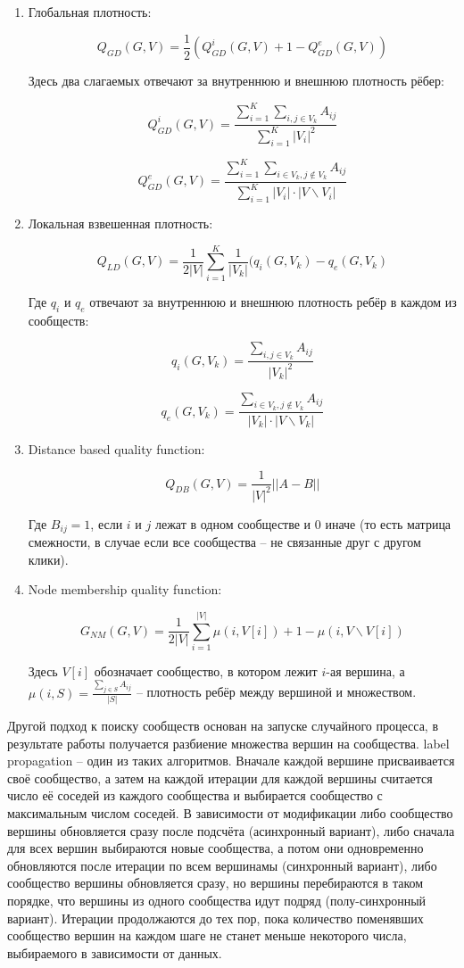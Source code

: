 \documentclass{article}
\begin{document}
\begin{enumerate}
	\item Глобальная плотность:
	
	$$Q_{GD} (G, V) = \frac{1}{2} (Q^i_{GD} (G, V) + 1 - Q^e_{GD} (G, V)) $$	
	
	Здесь два слагаемых отвечают за внутреннюю и внешнюю плотность рёбер:
	
	$$Q^i_{GD} (G, V) = \frac{\sum_{i=1}^K \sum_{i,j\in V_k} A_{ij}}{\sum_{i=1}^K |V_i|^2}$$
	
	$$Q^e_{GD} (G, V) = \frac{\sum_{i=1}^K \sum_{i \in V_k,j \not\in V_k} A_{ij}}
	{\sum_{i=1}^K |V_i| \cdot |V \backslash V_i|}$$
	
	\item Локальная взвешенная плотность:
	
	$$Q_{LD} (G, V) = \frac{1}{2 |V|} \sum_{i=1}^K \frac{1}{|V_k|} (q_i(G, V_k) - q_e(G, V_k)$$
	
	Где $q_i$ и $q_e$ отвечают за внутреннюю и внешнюю плотность ребёр в каждом из сообществ:
	
	$$q_i(G, V_k) = \frac{\sum_{i, j \in V_k} A_{ij}}{|V_k|^2}$$
	
	$$q_e(G, V_k) = \frac{\sum_{i \in V_k, j \not\in V_k} A_{ij}}{|V_k| \cdot |V \backslash V_k|}$$
	
	\item Distance based quality function:
	
	$$Q_{DB} (G, V) = \frac{1}{|V|^2} ||A - B||$$
	
	Где $B_{ij} = 1$, если $i$ и $j$ лежат в одном сообществе и $0$ иначе (то есть матрица смежности, в случае если все сообщества -- не связанные друг с другом клики).
	
	\item Node membership quality function:
	
	$$G_{NM} (G, V) = \frac{1}{2|V|} \sum_{i=1}^{|V|} \mu (i, V[i]) + 1 - \mu (i, V \backslash V[i]) $$
	
	Здесь $V[i]$ обозначает сообщество, в котором лежит $i$-ая вершина, а $\mu(i, S) = \frac{\sum_{j\in S} A_{ij}}{|S|}$ -- плотность ребёр между вершиной и множеством.
	
\end{enumerate}


Другой подход к поиску сообществ основан на запуске случайного процесса, в результате работы получается разбиение множества вершин на сообщества. label propagation\cite{label_prop} -- один из таких алгоритмов. Вначале каждой вершине присваивается своё сообщество, а затем на каждой итерации для каждой вершины считается число её соседей из каждого сообщества и выбирается сообщество с максимальным числом соседей. В зависимости от модификации либо сообщество вершины обновляется сразу после подсчёта (асинхронный вариант), либо сначала для всех вершин выбираются новые сообщества, а потом они одновременно обновляются после итерации по всем вершинамы (синхронный вариант), либо сообщество вершины обновляется сразу, но вершины перебираются в таком порядке, что вершины из одного сообщества идут подряд (полу-синхронный вариант). Итерации продолжаются до тех пор, пока количество поменявших сообщество вершин на каждом шаге не станет меньше некоторого числа, выбираемого в зависимости от данных.
\end{document}
